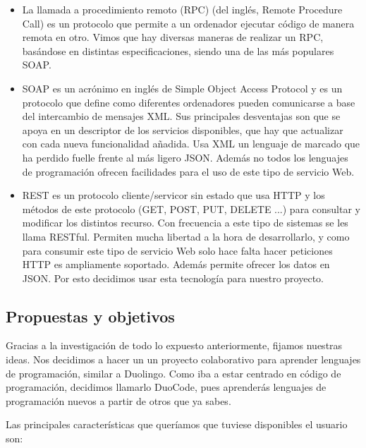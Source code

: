 \begin{itemize}
\item
La llamada a procedimiento remoto (RPC) (del inglés, Remote Procedure Call) es un protocolo que permite a un ordenador ejecutar código de manera remota en otro. Vimos que hay diversas maneras de realizar un RPC, basándose en distintas especificaciones, siendo una de las más populares SOAP.

\item
SOAP es un acrónimo en inglés de Simple Object Access Protocol y es un protocolo que define como diferentes ordenadores pueden comunicarse a base del intercambio de mensajes XML. Sus principales desventajas son que se apoya en un descriptor de los servicios disponibles, que hay que actualizar con cada nueva funcionalidad añadida. Usa XML un lenguaje de marcado que ha perdido fuelle frente al más ligero JSON. Además no todos los lenguajes de programación ofrecen facilidades para el uso de este tipo de servicio Web.

\item
REST es un protocolo cliente/servicor sin estado que usa HTTP y los métodos de este protocolo (GET, POST, PUT, DELETE ...) para consultar y modificar los distintos recurso. Con frecuencia a este tipo de sistemas se les llama RESTful. Permiten mucha libertad a la hora de desarrollarlo, y como para consumir este tipo de servicio Web solo hace falta hacer peticiones HTTP es ampliamente soportado. Además permite ofrecer los datos en JSON. Por esto decidimos usar esta tecnología para nuestro proyecto.

\end{itemize}

\subsection{Propuestas y objetivos\label{subsec:introduction}}

Gracias a la investigación de todo lo expuesto anteriormente, fijamos nuestras ideas. Nos decidimos a hacer un un proyecto colaborativo para aprender lenguajes de programación, similar a Duolingo. Como iba a estar centrado en código de programación, decidimos llamarlo DuoCode, pues aprenderás lenguajes de programación nuevos a partir de otros que ya sabes. 
\vspace{1em}

Las principales características que queríamos que tuviese disponibles el usuario son:

